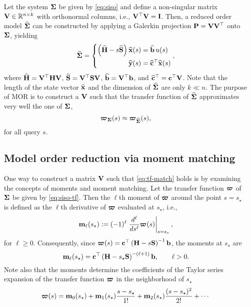 Let the system $\mathbf{\Sigma}$ be given by \eqref{eq:siso} and define a non-singular matrix $\bV \inR[n][k]$ with orthonormal columns, i.e., $\mathbf{V}^\top \mathbf{V} = \mathbf{I}$. Then, a reduced order model $\widehat{\mathbf{\Sigma}}$ can be constructed by applying a Galerkin projection $\mathbf{P} = \mathbf{V}\mathbf{V}^\top$ onto $\mathbf{\Sigma}$, yielding
\begin{equation}
  \widehat{\mathbf{\Sigma}} = \left\{\begin{aligned}
    \left( \widehat{\mathbf{H}} - s\widehat{\mathbf{S}} \right) \widehat{\mathbf{x}}(s) &= \widehat{\mathbf{b}}\,u(s) \\
                                \widehat{\mathbf{y}}(s) &= \widehat{\mathbf{c}}^\top \widehat{\mathbf{x}}(s)
  \end{aligned}\right.,
\end{equation}
where $\widehat{\mathbf{H}} = \mathbf{V}^\top \mathbf{H} \mathbf{V}$, $\widehat{\mathbf{S}} = \mathbf{V}^\top \mathbf{S} \mathbf{V}$, $\widehat{\mathbf{b}} = \mathbf{V}^\top \mathbf{b}$, and $\widehat{\mathbf{c}}^\top = \mathbf{c}^\top \mathbf{V}$. Note that the length of the state vector $\widehat{\mathbf{x}}$ and the dimension of $\widehat{\mathbf{\Sigma}}$ are only $k \ll n$. The purpose of MOR is to construct a $\mathbf{V}$ such that the transfer function of $\widehat{\mathbf{\Sigma}}$ approximates very well the one of $\mathbf{\Sigma}$,
\begin{equation}
  \boldsymbol{\varpi}_{\mathbf{\Sigma}}(s) \approx \boldsymbol{\varpi}_{\widehat{\mathbf{\Sigma}}}(s),
  \label{eq:tf-match}
\end{equation}
for all query $s$.

\subsection{Model order reduction via moment matching}
\label{lds:mm}

One way to construct a matrix $\mathbf{V}$ such that \eqref{eq:tf-match} holds is by examining the concepts of moments and moment matching\cite{Antoulas2005}. Let the transfer function $\boldsymbol{\varpi}$ of $\mathbf{\Sigma}$ be given by \eqref{eq:siso-tf}. Then the $\ell$th moment of $\boldsymbol{\varpi}$ around the point $s = s_\star$ is defined as the $\ell$th derivative of $\boldsymbol{\varpi}$ evaluated at $s_\star$, i.e.,
\begin{equation}
  \mathbf{m}_\ell(s_\star) := (-1)^\ell \left.\frac{d^\ell}{ds^\ell} \boldsymbol{\varpi}(s) \right|_{s=s_\star},
  \label{eq:moment}
\end{equation}
for $\ell \geq 0$. Consequently, since $\boldsymbol{\varpi}(s) = \mathbf{c}^\top \left( \mathbf{H} - s\mathbf{S} \right)^{-1} \mathbf{b}$, the moments at $s_\star$ are
$$
  \mathbf{m}_\ell(s_\star) = \mathbf{c}^\top \left( \mathbf{H} - s_\star \mathbf{S} \right)^{-(\ell+1)} \mathbf{b}, \qquad \ell > 0.
$$
Note also that the moments determine the coefficients of the Taylor series expansion of the transfer function $\boldsymbol{\varpi}$ in the neighborhood of $s_\star$
\begin{equation}
  \boldsymbol{\varpi}(s) = \mathbf{m}_0(s_\star) + \mathbf{m}_1(s_\star) \frac{s - s_\star}{1!} + \mathbf{m}_2(s_\star) \frac{(s - s_\star)^2}{2!} + \cdots
\end{equation}

